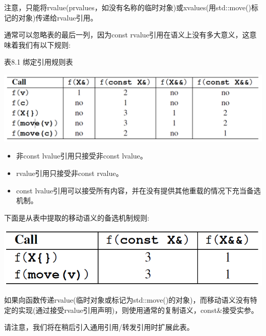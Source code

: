 注意，只能将rvalue(prvalues，如没有名称的临时对象)或xvalues(用std::move()标记的对象)传递给rvalue引用。\par

通常可以忽略表的最后一列，因为const rvalue引用在语义上没有多大意义，这意味着我们有以下规则:\par

\hspace*{\fill} \par %
表8.1 绑定引用规则表

\begin{center}
	\includegraphics[width=1.0\textwidth]{content/1/chapter8/images/3}
\end{center}

\begin{itemize}
	\item 非const lvalue引用只接受非const lvalue。 
	\item rvalue引用只接受非const rvalue。
	\item const lvalue引用可以接受所有内容，并在没有提供其他重载的情况下充当备选机制。
\end{itemize}

下面是从表中提取的移动语义的备选机制规则:\par

\begin{center}
	\includegraphics[width=1.0\textwidth]{content/1/chapter8/images/4}
\end{center}

如果向函数传递rvalue(临时对象或标记为std::move()的对象)，而移动语义没有特定的实现(通过接受rvalue引用声明)，则使用通常的复制语义，const\&接受实参。\par

请注意，我们将在稍后引入通用引用/转发引用时扩展此表。\par

